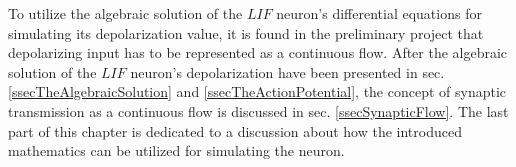 \documentclass[b5paper,12 pt]{report}
\begin{document}
To utilize the algebraic solution of the $LIF$ neuron's differential equations for simulating its depolarization value, 
	it is found in the preliminary project that depolarizing input has to be represented as a continuous flow\cite{FDP_report}.
After the algebraic solution of the $LIF$ neuron's depolarization have been presented in sec.  \ref{ssecTheAlgebraicSolution} and \ref{ssecTheActionPotential},
	the concept of synaptic transmission as a continuous flow is discussed in sec. \ref{ssecSynapticFlow}.
The last part of this chapter is dedicated to a discussion about how the introduced mathematics can be utilized for simulating the neuron. 

	
	








\end{document}

